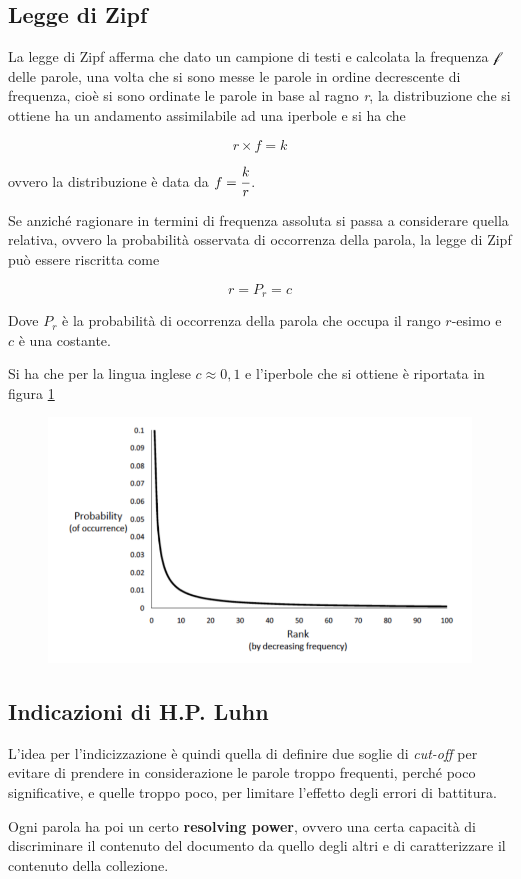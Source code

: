 \subsection{Legge di Zipf}

La legge di Zipf afferma che dato un campione di testi e calcolata la frequenza $\mathcal{f}$ delle parole, una volta che si sono messe le parole in ordine decrescente di frequenza, cioè si sono ordinate le parole in base al ragno \textit{r}, la distribuzione che si ottiene ha un andamento assimilabile ad una iperbole e si ha che

$$
r \times f = k
$$

ovvero la distribuzione è data da $ f = \cfrac{k}{r}$.

Se anziché ragionare in termini di frequenza assoluta si passa a considerare quella relativa, ovvero la probabilità osservata di occorrenza della parola, la legge di Zipf può essere riscritta come 

$$
r = P_r = c
$$

Dove $P_r$ è la probabilità di occorrenza della parola che occupa il rango $r$-esimo e $c$ è una costante.

Si ha che per la lingua inglese $c \approx 0,1$ e l'iperbole che si ottiene è riportata in figura \ref{fig:zipf}

\begin{figure}[htbp]
\centering
\includegraphics[width=0.55\linewidth]{images/l3-zipf}
\label{fig:zipf}
\end{figure}

\subsection{Indicazioni di H.P. Luhn}

L'idea per l'indicizzazione è quindi quella di definire due soglie di \textit{cut-off} per evitare di prendere in considerazione le parole troppo frequenti, perché poco significative, e quelle troppo poco, per limitare l'effetto degli errori di battitura.

Ogni parola ha poi un certo \textbf{resolving power}, ovvero una certa capacità di discriminare il contenuto del documento da quello degli altri e di caratterizzare il contenuto della collezione.

